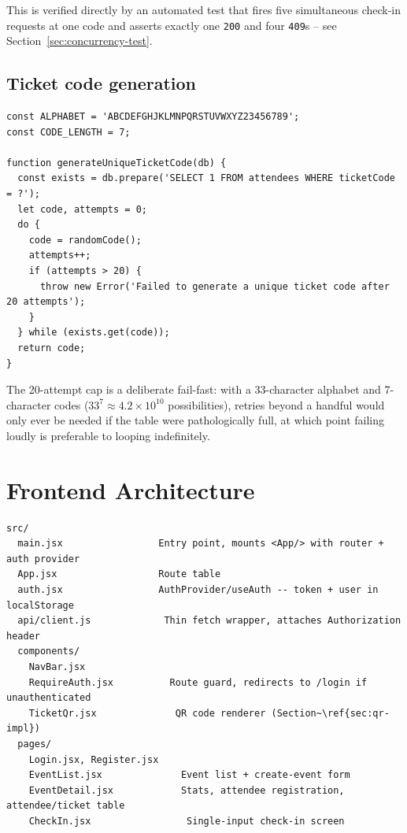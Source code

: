 ﻿\documentclass[11pt,letterpaper]{report}
\newcommand{\code}[1]{\lstinline[breaklines=true]{#1}}
\begin{document}
This is verified directly by an automated test that fires five
simultaneous check-in requests at one code and asserts exactly one
\code{200} and four \code{409}s -- see
Section~\ref{sec:concurrency-test}.

\subsection{Ticket code generation}

\begin{lstlisting}[caption={ticketCode.js}]
const ALPHABET = 'ABCDEFGHJKLMNPQRSTUVWXYZ23456789';
const CODE_LENGTH = 7;

function generateUniqueTicketCode(db) {
  const exists = db.prepare('SELECT 1 FROM attendees WHERE ticketCode = ?');
  let code, attempts = 0;
  do {
    code = randomCode();
    attempts++;
    if (attempts > 20) {
      throw new Error('Failed to generate a unique ticket code after 20 attempts');
    }
  } while (exists.get(code));
  return code;
}
\end{lstlisting}

The 20-attempt cap is a deliberate fail-fast: with a 33-character
alphabet and 7-character codes ($33^7 \approx 4.2 \times 10^{10}$
possibilities), retries beyond a handful would only ever be needed if
the table were pathologically full, at which point failing loudly is
preferable to looping indefinitely.

\section{Frontend Architecture}

\begin{lstlisting}[caption={Frontend source layout}]
src/
  main.jsx                 Entry point, mounts <App/> with router + auth provider
  App.jsx                  Route table
  auth.jsx                 AuthProvider/useAuth -- token + user in localStorage
  api/client.js             Thin fetch wrapper, attaches Authorization header
  components/
    NavBar.jsx
    RequireAuth.jsx          Route guard, redirects to /login if unauthenticated
    TicketQr.jsx              QR code renderer (Section~\ref{sec:qr-impl})
  pages/
    Login.jsx, Register.jsx
    EventList.jsx              Event list + create-event form
    EventDetail.jsx            Stats, attendee registration, attendee/ticket table
    CheckIn.jsx                 Single-input check-in screen
\end{lstlisting}
\end{document}
